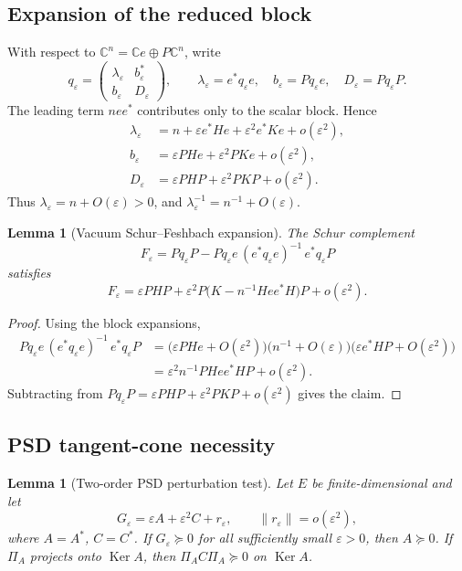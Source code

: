 \documentclass[11pt]{article}
\newtheorem{lemma}[theorem]{Lemma}
\newcommand{\C}{\mathbb C}
\newcommand{\eps}{\varepsilon}
\newcommand{\Ker}{\operatorname{Ker}}
\newcommand{\norm}[1]{\lVert #1\rVert}
\begin{document}
\subsection{Expansion of the reduced block}

With respect to \(\C^n=\C e\oplus P\C^n\), write
\[
  q_\eps=\begin{pmatrix}
    \lambda_\eps & b_\eps^*\\
    b_\eps & D_\eps
  \end{pmatrix},
  \qquad
  \lambda_\eps=e^*q_\eps e,
  \quad b_\eps=Pq_\eps e,
  \quad D_\eps=Pq_\eps P.
\]
The leading term \(nee^*\) contributes only to the scalar block.  Hence
\begin{align*}
  \lambda_\eps
  &=n+\eps e^*He+\eps^2e^*Ke+o(\eps^2),\\
  b_\eps
  &=\eps PHe+\eps^2PKe+o(\eps^2),\\
  D_\eps
  &=\eps PHP+\eps^2PKP+o(\eps^2).
\end{align*}
Thus \(\lambda_\eps=n+O(\eps)>0\), and \(\lambda_\eps^{-1}=n^{-1}+O(\eps)\).

\begin{lemma}[Vacuum Schur--Feshbach expansion]
\label{lem:app-feshbach-expansion}
The Schur complement
\[
  F_\eps=Pq_\eps P-Pq_\eps e\,(e^*q_\eps e)^{-1}\,e^*q_\eps P
\]
satisfies
\[
  F_\eps=\eps PHP+
  \eps^2P\bigl(K-n^{-1}Hee^*H\bigr)P+o(\eps^2).
\]
\end{lemma}

\begin{proof}
Using the block expansions,
\begin{align*}
  Pq_\eps e\,(e^*q_\eps e)^{-1}\,e^*q_\eps P
  &=\bigl(\eps PHe+O(\eps^2)\bigr)
    \bigl(n^{-1}+O(\eps)\bigr)
    \bigl(\eps e^*HP+O(\eps^2)\bigr)\\
  &=\eps^2n^{-1}PHee^*HP+o(\eps^2).
\end{align*}
Subtracting from \(Pq_\eps P=\eps PHP+\eps^2PKP+o(\eps^2)\) gives the claim.
\end{proof}

\subsection{PSD tangent-cone necessity}

\begin{lemma}[Two-order PSD perturbation test]
\label{lem:app-two-order-test}
Let \(E\) be finite-dimensional and let
\[
  G_\eps=\eps A+\eps^2C+r_\eps,
  \qquad \norm{r_\eps}=o(\eps^2),
\]
where \(A=A^*\), \(C=C^*\).  If \(G_\eps\succeq0\) for all sufficiently small \(\eps>0\), then \(A\succeq0\).  If \(\Pi_A\) projects onto \(\Ker A\), then \(\Pi_A C\Pi_A\succeq0\) on \(\Ker A\).
\end{lemma}
\end{document}
